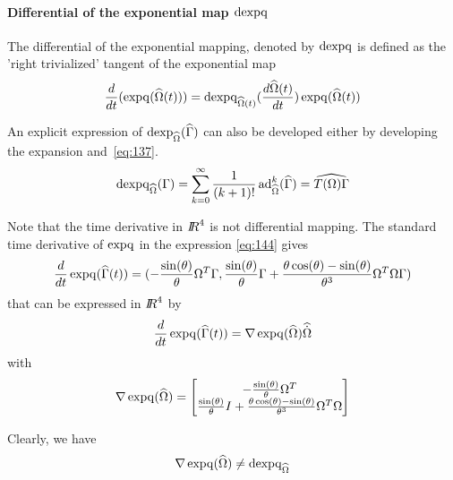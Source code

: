 \paragraph{Differential of the exponential map $\operatorname{dexpq}$}
The differential of the exponential mapping, denoted by $\operatorname{dexpq}$ is defined as the 'right trivialized' tangent of the exponential map
\begin{equation}
  \label{eq:71}
  \frac{d}{dt} (\operatorname{expq}(\widehat \Omega(t))) = \operatorname{dexpq}_{\widehat\Omega(t)}(\frac{d \widehat{\Omega}(t)}{dt}) \operatorname{expq}(\widehat\Omega(t))
\end{equation}

An explicit expression of $\operatorname{dexp}_{\widehat\Omega}(\widehat\Gamma)$ can also be developed either by developing the expansion and~\eqref{eq:137}.
\begin{equation}
  \label{eq:168}
   \operatorname{dexpq}_{\widehat\Omega}(\Gamma) = \sum_{k=0}^\infty \frac{1}{(k+1)!} \operatorname{ad}_{\widehat\Omega}^k (\widehat\Gamma) = \widehat{T(\Omega)\Gamma}
\end{equation}

\begin{remark}
Note that the time derivative in $\mbox{\rm $I\!\!R$}^4$ is not differential mapping.
The standard time derivative of $\operatorname{expq}$ in the expression \eqref{eq:144} gives
\begin{equation}
  \label{eq:171}
    \frac{d}{dt}\operatorname{expq}(\widehat \Gamma(t)) = (- \frac{\sin(\theta)}{\theta} \Omega^T\Gamma, \frac{\sin(\theta)}{\theta}\Gamma  +\frac{\theta \cos(\theta)-\sin(\theta)}{\theta^3}\Omega^T\Omega \Gamma  )
\end{equation}
that can be expressed in $\mbox{\rm $I\!\!R$}^4$ by
\begin{equation}
  \label{eq:175}
  \frac{d}{dt}\operatorname{expq}(\widehat \Gamma(t))  = \nabla \operatorname{expq}(\widehat\Omega) \widehat{\dot\Omega}
\end{equation}
with
\begin{equation}
  \label{eq:176}
  \nabla \operatorname{expq}(\widehat\Omega) =
  \begin{bmatrix}
    - \frac{\sin(\theta)}{\theta} \Omega^T \\
    \frac{\sin(\theta)}{\theta}I  +\frac{\theta \cos(\theta)-\sin(\theta)}{\theta^3}\Omega^T\Omega
  \end{bmatrix}
\end{equation}

Clearly, we have
\begin{equation}
  \label{eq:177}
  \nabla \operatorname{expq}(\widehat\Omega) \neq  \operatorname{dexpq}_{\widehat\Omega}
\end{equation}
\end{remark}


